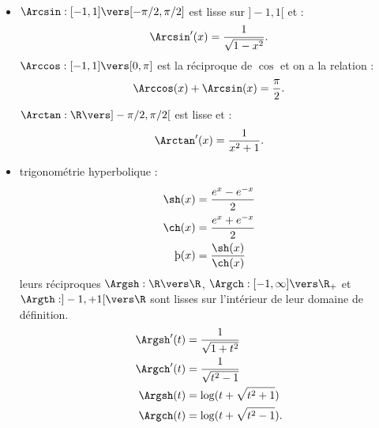 \begin{itemize}
\begin{align*}
\end{align*}
\item $\Arcsin : [-1,1] \vers [-\pi/2,\pi/2]$ est lisse sur $]-1,1[$ et : \[ \Arcsin' (x) = \frac{1}{\sqrt{1-x^{2}}}.\]$\Arccos : [-1,1] \vers [0,\pi]$ est la réciproque de $\cos$ et on a la relation : \[ \Arccos(x) + \Arcsin(x) = \frac{\pi}{2}.\]$\Arctan : \R\vers ]-\pi/2,\pi/2[$ est lisse et : \[ \Arctan'(x) = \frac{1}{x^{2}+1}.\]
\item trigonométrie hyperbolique : 
\begin{align*}
\sh(x) &= \frac{e^{x} - e^{-x}}{2} \\
\ch(x) &= \frac{e^{x} + e^{-x}}{2} \\
\th(x) &= \frac{\sh(x)}{\ch(x)}
\end{align*}leurs réciproques $\Argsh : \R \vers \R$, $\Argch : [-1,\infty]\vers \R_+$ et $\Argth:]-1,+1[ \vers \R$ sont lisses sur l'intérieur de leur domaine de définition.
\begin{align*}
\Argsh'(t) &= \frac{1}{\sqrt{1+t^{2}}} \\
\Argch'(t) &= \frac{1}{\sqrt{t^{2}-1}} \\
\Argsh(t) &= \log(t + \sqrt{t^{2}+1}) \\
\Argch(t) &= \log(t + \sqrt{t^{2}-1}).
\end{align*}
\end{itemize}


